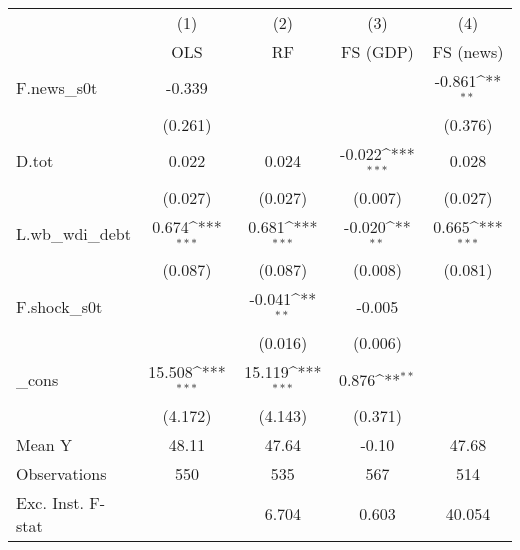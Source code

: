 {
\def\sym#1{\ifmmode^{#1}\else\(^{#1}\)\fi}
\begin{tabular}{l*{4}{c}}
\toprule
            &\multicolumn{1}{c}{(1)}&\multicolumn{1}{c}{(2)}&\multicolumn{1}{c}{(3)}&\multicolumn{1}{c}{(4)}\\
            &\multicolumn{1}{c}{OLS}&\multicolumn{1}{c}{RF}&\multicolumn{1}{c}{FS (GDP)}&\multicolumn{1}{c}{FS (news)}\\
\midrule
F.news\_s0t  &      -0.339         &                     &                     &      -0.861\sym{**} \\
            &     (0.261)         &                     &                     &     (0.376)         \\
\addlinespace
D.tot       &       0.022         &       0.024         &      -0.022\sym{***}&       0.028         \\
            &     (0.027)         &     (0.027)         &     (0.007)         &     (0.027)         \\
\addlinespace
L.wb\_wdi\_debt&       0.674\sym{***}&       0.681\sym{***}&      -0.020\sym{**} &       0.665\sym{***}\\
            &     (0.087)         &     (0.087)         &     (0.008)         &     (0.081)         \\
\addlinespace
F.shock\_s0t &                     &      -0.041\sym{**} &      -0.005         &                     \\
            &                     &     (0.016)         &     (0.006)         &                     \\
\addlinespace
\_cons      &      15.508\sym{***}&      15.119\sym{***}&       0.876\sym{**} &                     \\
            &     (4.172)         &     (4.143)         &     (0.371)         &                     \\
\midrule
Mean Y      &       48.11         &       47.64         &       -0.10         &       47.68         \\
Observations&         550         &         535         &         567         &         514         \\
Exc. Inst. F-stat&                     &       6.704         &       0.603         &      40.054         \\
\bottomrule
\end{tabular}
}
